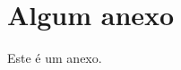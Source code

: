 \documentclass[_ArquivoPrincipal.tex]{subfiles}
\begin{document}
\chapter{Algum anexo}

Este é um anexo.
\end{document}
